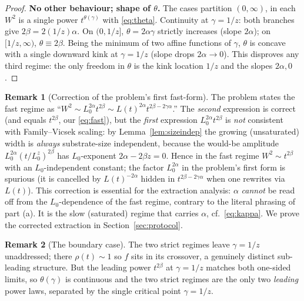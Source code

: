 \documentclass{amsart}
\theoremstyle{definition}
\newtheorem{remark}{Remark}
\newcommand{\asymp}{\sim}
\begin{document}
\begin{proof}
\medskip\noindent\textbf{No other behaviour; shape of $\theta$.} The cases
partition $(0,\infty)$, in each $W^2$ is a single power $t^{\theta(\gamma)}$ with
\eqref{eq:theta}. Continuity at $\gamma=1/z$: both branches give
$2\beta=2(1/z)\alpha$. On $(0,1/z]$, $\theta=2\alpha\gamma$ strictly increases
(slope $2\alpha$); on $[1/z,\infty)$, $\theta\equiv2\beta$. Being the minimum of
two affine functions of $\gamma$, $\theta$ is concave with a single downward kink
at $\gamma=1/z$ (slope drops $2\alpha\to0$). This disproves any third regime: the
only freedom in $\theta$ is the kink location $1/z$ and the slopes $2\alpha,0$.
\end{proof}

\begin{remark}[Correction of the problem's first fast-form]\label{rem:correction}
The problem states the fast regime as
``$W^2\asymp L_0^{2\alpha}t^{2\beta}\asymp L(t)^{2\alpha}t^{2\beta-2\gamma\alpha}$.''
The \emph{second} expression is correct (and equals $t^{2\beta}$, our
\eqref{eq:fast}), but the \emph{first} expression $L_0^{2\alpha}t^{2\beta}$ is
\emph{not} consistent with Family--Vicsek scaling: by
Lemma~\ref{lem:sizeindep} the growing (unsaturated) width is \emph{always}
substrate-size independent, because the would-be amplitude
$L_0^{2\alpha}(t/L_0^{z})^{2\beta}$ has $L_0$-exponent $2\alpha-2\beta z=0$. Hence
in the fast regime $W^2\asymp t^{2\beta}$ with an $L_0$-independent constant; the
factor $L_0^{2\alpha}$ in the problem's first form is spurious (it is cancelled by
$L(t)^{-2\alpha}$ hidden in $t^{2\beta-2\gamma\alpha}$ when one rewrites via
$L(t)$). This correction is essential for the extraction analysis: $\alpha$
\emph{cannot} be read off from the $L_0$-dependence of the fast regime, contrary to
the literal phrasing of part (a). It is the slow (saturated) regime that carries
$\alpha$, cf.\ \eqref{eq:kappa}. We prove the corrected extraction in
Section~\ref{sec:protocol}.
\end{remark}

\begin{remark}[The boundary case]
The two strict regimes leave $\gamma=1/z$ unaddressed; there $\rho(t)\asymp1$ so
$f$ sits in its crossover, a genuinely distinct sub-leading structure. But the
leading power $t^{2\beta}$ at $\gamma=1/z$ matches both one-sided limits, so
$\theta(\gamma)$ is continuous and the two strict regimes are the only two
\emph{leading} power laws, separated by the single critical point $\gamma=1/z$.
\end{remark}
\end{document}
